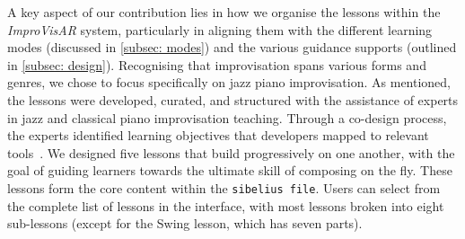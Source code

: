 \documentclass{vgtc}                          %
\begin{document}
\par %
A key aspect of our contribution lies in how we organise the lessons within the \textit{ImproVisAR} system, particularly in aligning them with the different learning modes (discussed in \autoref{subsec: modes}) and the various guidance supports (outlined in \autoref{subsec: design}). Recognising that improvisation spans various forms and genres, we chose to focus specifically on jazz piano improvisation. As mentioned, the lessons were developed, curated, and structured with the assistance of experts in jazz and classical piano improvisation teaching. Through a co-design process, the experts identified learning objectives that developers mapped to relevant tools~\cite{deja2024teach}.
We designed five lessons that build progressively on one another, with the goal of guiding learners towards the ultimate skill of composing on the fly. These lessons form the core content within the \texttt{sibelius file}. Users can select from the complete list of lessons in the interface, with most lessons broken into eight sub-lessons (except for the Swing lesson, which has seven parts).
\end{document}
